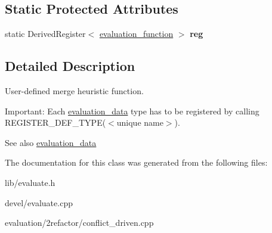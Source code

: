 \subsection*{Static Protected Attributes}
\begin{DoxyCompactItemize}
\item 
static Derived\+Register$<$ \hyperlink{classevaluation__function}{evaluation\+\_\+function} $>$ {\bfseries reg}\hypertarget{classevaluation__function_a254a3ccfbe2bdd5c9b84ad4e52599e50}{}\label{classevaluation__function_a254a3ccfbe2bdd5c9b84ad4e52599e50}

\end{DoxyCompactItemize}


\subsection{Detailed Description}
User-\/defined merge heuristic function. 

Important\+: Each \hyperlink{classevaluation__data}{evaluation\+\_\+data} type has to be registered by calling R\+E\+G\+I\+S\+T\+E\+R\+\_\+\+D\+E\+F\+\_\+\+T\+Y\+P\+E($<$unique name$>$). \begin{DoxySeeAlso}{See also}
\hyperlink{classevaluation__data}{evaluation\+\_\+data} 
\end{DoxySeeAlso}


The documentation for this class was generated from the following files\+:\begin{DoxyCompactItemize}
\item 
lib/evaluate.\+h\item 
devel/evaluate.\+cpp\item 
evaluation/2refactor/conflict\+\_\+driven.\+cpp\end{DoxyCompactItemize}
